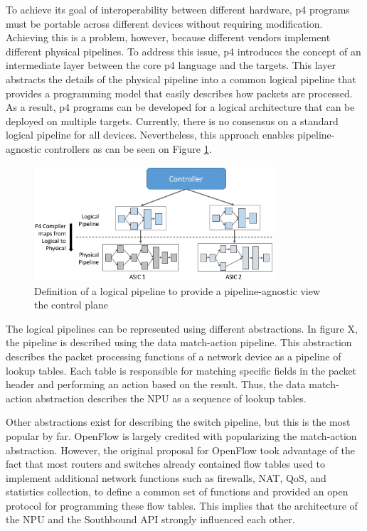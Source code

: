 To achieve its goal of interoperability between different hardware, \gls{p4} programs must be portable across different devices without requiring modification. Achieving this is a problem, however, because different vendors implement different physical pipelines. To address this issue, \gls{p4} introduces the concept of an intermediate layer between the core \gls{p4} language and the targets\cite{hauser_survey_2021}. This layer abstracts the details of the physical pipeline into a common logical pipeline that provides a programming model that easily describes how packets are processed. As a result, \gls{p4} programs can be developed for a logical architecture that can be deployed on multiple targets. Currently, there is no consensus on a standard logical pipeline for all devices. Nevertheless, this approach enables pipeline-agnostic controllers as can be seen on Figure \ref{fig:pipeline_abstraction}. 

\begin{figure}
	\centering
	\includegraphics[width=0.8\textwidth]{Chapters/Figures/SDNs/pipeline_abstraction.png}
	\caption{Definition of a logical pipeline to provide a pipeline-agnostic view the control plane\cite{peterson_software-defined_2021}}
	\label{fig:pipeline_abstraction}
\end{figure}


The logical pipelines can be represented using different abstractions. In figure X, the pipeline is described using the data match-action pipeline. This abstraction describes the packet processing functions of a network device as a pipeline of lookup tables. Each table is responsible for matching specific fields in the packet header and performing an action based on the result\cite{bifulco_survey_2018}\cite{kreutz_software-defined_2015}. Thus, the data match-action abstraction describes the NPU as a sequence of lookup tables. 

Other abstractions exist for describing the switch pipeline, but this is the most popular by far. OpenFlow is largely credited with popularizing the match-action abstraction\cite{bifulco_survey_2018}. However, the original proposal for OpenFlow took advantage of the fact that most routers and switches already contained flow tables used to implement additional network functions such as firewalls, NAT, QoS, and statistics collection, to define a common set of functions and provided an open protocol for programming these flow tables\cite{mckeown_openflow_2008}. This implies that the architecture of the NPU and the Southbound API strongly influenced each other.

